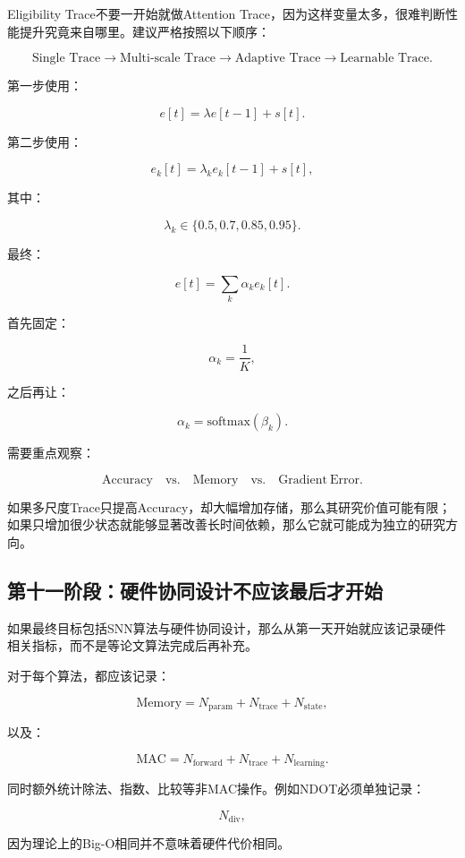 \documentclass[journal,12pt,onecolumn]{IEEEtran}
\begin{document}
Eligibility Trace不要一开始就做Attention Trace，因为这样变量太多，很难判断性能提升究竟来自哪里。建议严格按照以下顺序：

\[
\text{Single Trace}
\rightarrow
\text{Multi-scale Trace}
\rightarrow
\text{Adaptive Trace}
\rightarrow
\text{Learnable Trace}.
\]

第一步使用：

\[
e[t]=\lambda e[t-1]+s[t].
\]

第二步使用：

\[
e_k[t]
=
\lambda_k e_k[t-1]+s[t],
\]

其中：

\[
\lambda_k\in
\{0.5,0.7,0.85,0.95\}.
\]

最终：

\[
e[t]
=
\sum_k\alpha_k e_k[t].
\]

首先固定：

\[
\alpha_k=\frac{1}{K},
\]

之后再让：

\[
\alpha_k
=
\mathrm{softmax}(\beta_k).
\]

需要重点观察：

\[
\mathrm{Accuracy}
\quad
\text{vs.}
\quad
\mathrm{Memory}
\quad
\text{vs.}
\quad
\mathrm{Gradient\ Error}.
\]

如果多尺度Trace只提高Accuracy，却大幅增加存储，那么其研究价值可能有限；如果只增加很少状态就能够显著改善长时间依赖，那么它就可能成为独立的研究方向。


\subsection{第十一阶段：硬件协同设计不应该最后才开始}

如果最终目标包括SNN算法与硬件协同设计，那么从第一天开始就应该记录硬件相关指标，而不是等论文算法完成后再补充。

对于每个算法，都应该记录：

\[
\mathrm{Memory}
=
N_{\mathrm{param}}
+
N_{\mathrm{trace}}
+
N_{\mathrm{state}},
\]

以及：

\[
\mathrm{MAC}
=
N_{\mathrm{forward}}
+
N_{\mathrm{trace}}
+
N_{\mathrm{learning}}.
\]

同时额外统计除法、指数、比较等非MAC操作。例如NDOT必须单独记录：

\[
N_{\mathrm{div}},
\]

因为理论上的Big-O相同并不意味着硬件代价相同。
\end{document}
